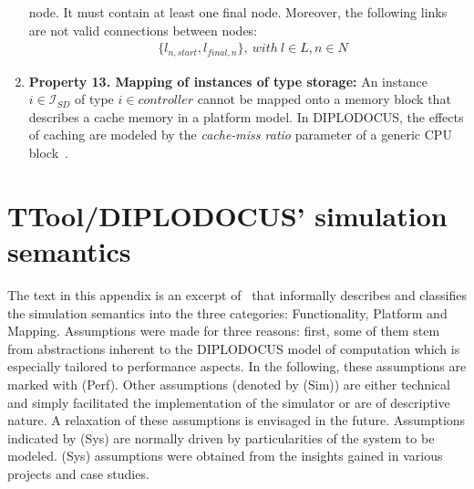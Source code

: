 \documentclass{llncs}
\begin{document}
\begin{subappendices}
\begin{enumerate}
	node. It must contain at least one final node. Moreover, the following links are not valid connections between
	nodes:
		\begin{align*}
			&\{l_{n,start}, l_{final,n}\},\ with\ l \in L, n \in N
		\end{align*}
	\item \textbf{Property 13. Mapping of instances of type storage:} An instance $i \in \mathcal{I}_{SD}$ of type $i
	\in {controller}$ cannot be mapped onto a memory block that describes a cache memory in a platform model. In
	DIPLODOCUS, the effects of caching are modeled by the \textit{cache-miss ratio} parameter of a generic CPU
	block~\cite{Apvrille06,Apvrille08}.
\end{enumerate}
%
%
%
\newpage
\section{TTool/DIPLODOCUS' simulation semantics}
\label{app:SimuSemantics}
%
The text in this appendix is an excerpt of~\cite{Knorreck11} that informally describes and classifies the simulation
semantics into the three categories: Functionality, Platform and Mapping. Assumptions were made for three reasons:
first, some of them stem from abstractions inherent to the DIPLODOCUS model of computation which is especially tailored
to performance aspects. In the following, these assumptions are marked with (Perf). Other assumptions (denoted by (Sim))
are either technical and simply facilitated the implementation of the simulator or are of descriptive nature. A
relaxation of these assumptions is envisaged in the future. Assumptions indicated by (Sys) are normally driven by
particularities of the system to be modeled. (Sys) assumptions were obtained from the insights gained in various
projects and case studies.


\end{subappendices}
\end{document}
